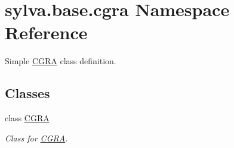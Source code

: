 \hypertarget{namespacesylva_1_1base_1_1cgra}{}\section{sylva.\+base.\+cgra Namespace Reference}
\label{namespacesylva_1_1base_1_1cgra}


Simple \hyperlink{classsylva_1_1base_1_1cgra_1_1_c_g_r_a}{C\+G\+RA} class definition.  


\subsection*{Classes}
\begin{DoxyCompactItemize}
\item 
class \hyperlink{classsylva_1_1base_1_1cgra_1_1_c_g_r_a}{C\+G\+RA}
\begin{DoxyCompactList}\small\item\em Class for \hyperlink{classsylva_1_1base_1_1cgra_1_1_c_g_r_a}{C\+G\+RA}. \end{DoxyCompactList}\end{DoxyCompactItemize}
